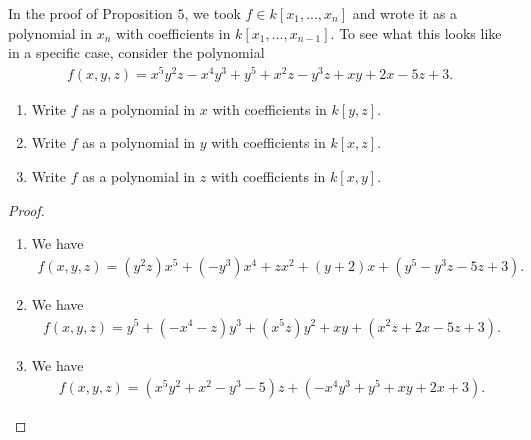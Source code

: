 \begin{exercise}{5}
In the proof of Proposition $5$, we took $f\in k[x_1,...,x_n]$ and wrote it as a polynomial in $x_n$ with coefficients in $k[x_1,...,x_{n-1}]$. 
To see what this looks like in a specific case, consider the polynomial
\begin{align*}
    f(x,y,z) = x^5 y^2 z - x^4 y^3 + y^5 + x^2 z - y^3 z + xy + 2x - 5z + 3.
\end{align*}
\begin{enumerate}
    \item Write $f$ as a polynomial in $x$ with coefficients in $k[y,z]$.
    \item Write $f$ as a polynomial in $y$ with coefficients in $k[x,z]$.
    \item Write $f$ as a polynomial in $z$ with coefficients in $k[x,y]$.
\end{enumerate}
\end{exercise}
\begin{proof}
    \begin{enumerate}
        \item We have
        \begin{align*}
            f(x,y,z) = (y^2 z)x^5 + (-y^3)x^4 + z x^2 + (y + 2)x + (y^5 - y^3 z - 5z + 3).
        \end{align*}
        \item We have
        \begin{align*}
            f(x,y,z) = y^5 + (-x^4 - z)y^3 + (x^5 z)y^2 + xy + (x^2 z + 2x - 5z + 3).
        \end{align*}
        \item We have
        \begin{align*}
            f(x,y,z) = (x^5 y^2 + x^2 - y^3 - 5)z + (-x^4y^3 + y^5 +xy + 2x + 3).  
        \end{align*}
    \end{enumerate}
\end{proof}

